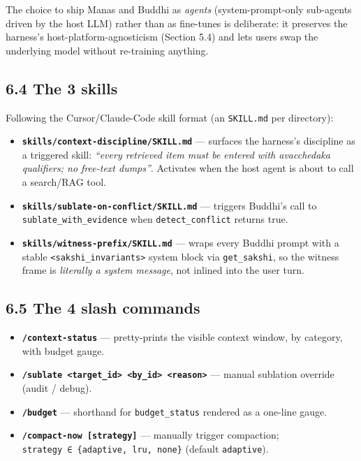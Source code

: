 The choice to ship Manas and Buddhi as \emph{agents} (system-prompt-only sub-agents driven by the host LLM) rather than as fine-tunes is deliberate: it preserves the harness's host-platform-agnosticism (Section 5.4) and lets users swap the underlying model without re-training anything.

\subsection{6.4 The 3 skills}\label{the-3-skills}

Following the Cursor/Claude-Code skill format (an \texttt{SKILL.md} per directory):

\begin{itemize}
\tightlist
\item
  \textbf{\texttt{skills/context-discipline/SKILL.md}} --- surfaces the harness's discipline as a triggered skill: \emph{``every retrieved item must be entered with avacchedaka qualifiers; no free-text dumps''}. Activates when the host agent is about to call a search/RAG tool.
\item
  \textbf{\texttt{skills/sublate-on-conflict/SKILL.md}} --- triggers Buddhi's call to \texttt{sublate\_with\_evidence} when \texttt{detect\_conflict} returns true.
\item
  \textbf{\texttt{skills/witness-prefix/SKILL.md}} --- wraps every Buddhi prompt with a stable \texttt{\textless{}sakshi\_invariants\textgreater{}} system block via \texttt{get\_sakshi}, so the witness frame is \emph{literally a system message}, not inlined into the user turn.
\end{itemize}

\subsection{6.5 The 4 slash commands}\label{the-4-slash-commands}

\begin{itemize}
\tightlist
\item
  \textbf{\texttt{/context-status}} --- pretty-prints the visible context window, by category, with budget gauge.
\item
  \textbf{\texttt{/sublate\ \textless{}target\_id\textgreater{}\ \textless{}by\_id\textgreater{}\ \textless{}reason\textgreater{}}} --- manual sublation override (audit / debug).
\item
  \textbf{\texttt{/budget}} --- shorthand for \texttt{budget\_status} rendered as a one-line gauge.
\item
  \textbf{\texttt{/compact-now\ {[}strategy{]}}} --- manually trigger compaction; \texttt{strategy\ ∈\ \{adaptive,\ lru,\ none\}} (default \texttt{adaptive}).
\end{itemize}

